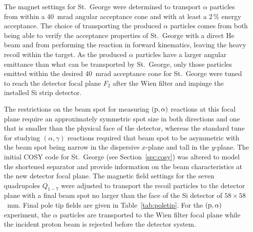 The magnet settings for St.\ George were determined to transport
$\alpha$ particles from within a 40~mrad angular acceptance cone and
with at least a 2\,\% energy acceptance. The choice of transporting the
produced $\alpha$ particles comes from both being able to verify the
acceptance properties of St.\ George with a direct He beam and from
performing the reaction in forward kinematics, leaving the heavy recoil
 within the  target. As the produced $\alpha$
particles have a larger angular emittance than what can be transported
by St.\ George, only those particles emitted within the desired 40~mrad
acceptance cone for St.\ George were tuned to reach the detector focal
plane $F_2$ after the Wien filter and impinge the installed Si strip
detector.

The restrictions on the beam spot for measuring $(\rm{p},\alpha)$
reactions at this focal plane require an approximately symmetric spot
size in both directions and one that is smaller than the physical face
of the detector, whereas the standard tune for studying
$(\alpha,\gamma)$ reactions required that beam spot to be asymmetric
with the beam spot being narrow in the dispersive $x$-plane and tall in
the $y$-plane. The initial COSY code for St.\ George (see
Section~\ref{sec:cosy}) was altered to model the shortened separator and
provide information on the beam characteristics at the new detector
focal plane. The magnetic field settings for the seven quadrupoles
$Q_{1-7}$ were adjusted to transport the recoil particles to the
detector plane with a final beam spot no larger than the face of the Si
detector of $58\times 58$~mm. Final pole tip fields are given in
Table~\ref{tab:poletip}. For the $(\rm{p},\alpha)$ experiment, the
$\alpha$ particles are transported to the Wien filter focal plane while
the incident proton beam is rejected before the detector system.

